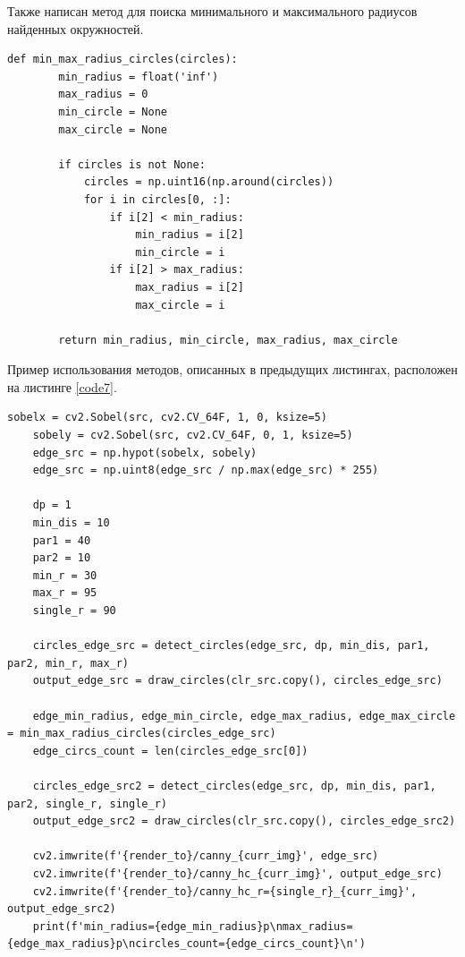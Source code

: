 \documentclass[a4paper, 16pt]{article}
\begin{document}
    \noindent Также написан метод для поиска минимального и максимального радиусов найденных окружностей.
    \begin{lstlisting}[label=code6, caption={Поиск минимального и максимального радиуса найденных окружностей.}]
    def min_max_radius_circles(circles):
        min_radius = float('inf')
        max_radius = 0
        min_circle = None
        max_circle = None
    
        if circles is not None:
            circles = np.uint16(np.around(circles))
            for i in circles[0, :]:
                if i[2] < min_radius:
                    min_radius = i[2]
                    min_circle = i
                if i[2] > max_radius:
                    max_radius = i[2]
                    max_circle = i
    
        return min_radius, min_circle, max_radius, max_circle
    \end{lstlisting}


    \noindent Пример использования методов, описанных в предыдущих листингах, расположен на листинге \ref{code7}.
    \begin{lstlisting}[label=code7, caption={Пример применения алгоритма Хафа для поиска окружностей.}]
    sobelx = cv2.Sobel(src, cv2.CV_64F, 1, 0, ksize=5)
    sobely = cv2.Sobel(src, cv2.CV_64F, 0, 1, ksize=5)
    edge_src = np.hypot(sobelx, sobely)
    edge_src = np.uint8(edge_src / np.max(edge_src) * 255)

    dp = 1
    min_dis = 10
    par1 = 40
    par2 = 10
    min_r = 30
    max_r = 95
    single_r = 90

    circles_edge_src = detect_circles(edge_src, dp, min_dis, par1, par2, min_r, max_r)
    output_edge_src = draw_circles(clr_src.copy(), circles_edge_src)

    edge_min_radius, edge_min_circle, edge_max_radius, edge_max_circle = min_max_radius_circles(circles_edge_src)
    edge_circs_count = len(circles_edge_src[0])

    circles_edge_src2 = detect_circles(edge_src, dp, min_dis, par1, par2, single_r, single_r)
    output_edge_src2 = draw_circles(clr_src.copy(), circles_edge_src2)

    cv2.imwrite(f'{render_to}/canny_{curr_img}', edge_src)
    cv2.imwrite(f'{render_to}/canny_hc_{curr_img}', output_edge_src)
    cv2.imwrite(f'{render_to}/canny_hc_r={single_r}_{curr_img}', output_edge_src2)
    print(f'min_radius={edge_min_radius}p\nmax_radius={edge_max_radius}p\ncircles_count={edge_circs_count}\n')
    \end{lstlisting}
\end{document}
